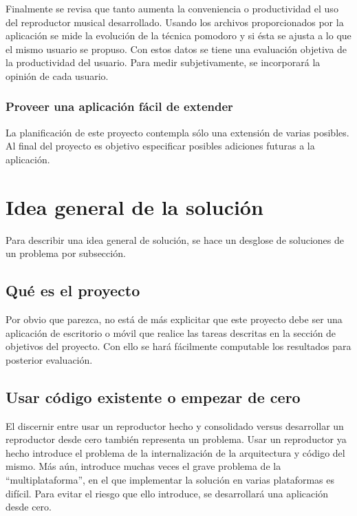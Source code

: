 \documentclass[12pt,letterpaper]{report}
\begin{document}
Finalmente se revisa que tanto aumenta la conveniencia o productividad
el uso del reproductor musical desarrollado. Usando los archivos
proporcionados por la aplicación se mide la evolución de la técnica
pomodoro y si ésta se ajusta a lo que el mismo usuario se propuso. Con
estos datos se tiene una evaluación objetiva de la productividad del
usuario. Para medir subjetivamente, se incorporará la opinión de cada
usuario.

\hypertarget{proveer-una-aplicaciuxf3n-fuxe1cil-de-extender}{%
\subsubsection{Proveer una aplicación fácil de
extender}\label{proveer-una-aplicaciuxf3n-fuxe1cil-de-extender}}

La planificación de este proyecto contempla sólo una extensión de varias
posibles. Al final del proyecto es objetivo especificar posibles
adiciones futuras a la aplicación.

\newpage
\hypertarget{idea-general-de-la-soluciuxf3n}{%
\section{Idea general de la
solución}\label{idea-general-de-la-soluciuxf3n}}

Para describir una idea general de solución, se hace un desglose de
soluciones de un problema por subsección.

\hypertarget{quuxe9-es-el-proyecto}{%
\subsection{Qué es el proyecto}\label{quuxe9-es-el-proyecto}}

Por obvio que parezca, no está de más explicitar que este proyecto debe
ser una aplicación de escritorio o móvil que realice las tareas
descritas en la sección de objetivos del proyecto. Con ello se hará
fácilmente computable los resultados para posterior evaluación.

\hypertarget{usar-cuxf3digo-existente-o-empezar-de-cero}{%
\subsection{Usar código existente o empezar de
cero}\label{usar-cuxf3digo-existente-o-empezar-de-cero}}

El discernir entre usar un reproductor hecho y consolidado versus
desarrollar un reproductor desde cero también representa un problema.
Usar un reproductor ya hecho introduce el problema de la internalización
de la arquitectura y código del mismo. Más aún, introduce muchas veces
el grave problema de la ``multiplataforma'', en el que implementar la
solución en varias plataformas es difícil. Para evitar el riesgo que
ello introduce, se desarrollará una aplicación desde cero.
\end{document}
